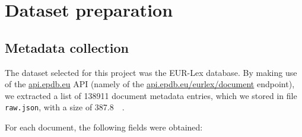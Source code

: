 \documentclass[sigconf, authorversion]{acmart}
\begin{document}
\section{Dataset preparation}

\subsection{Metadata collection} \label{ssec:metadata-collection}

The dataset selected for this project was the EUR-Lex database. By making use of the \url{api.epdb.eu} API (namely of the \url{api.epdb.eu/eurlex/document} endpoint), we extracted a list of \SI{138911}{} document metadata entries, which we stored in file \texttt{raw.json}, with a size of \SI{387.8}{\mega\byte}.

For each document, the following fields were obtained:
\end{document}
